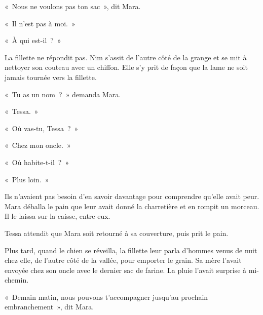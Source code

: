 \documentclass[10pt,a4paper]{article}
\begin{document}
«~Nous ne voulons pas ton sac~», dit Mara.

«~Il n’est pas à moi.~»

«~À qui est-il~?~»

La fillette ne répondit pas. Nim s’assit de l’autre côté de la grange et se mit à nettoyer son couteau avec un chiffon. Elle s’y prit de façon que la lame ne soit jamais tournée vers la fillette.

«~Tu as un nom~?~» demanda Mara.

«~Tessa.~»

«~Où vas-tu, Tessa~?~»

«~Chez mon oncle.~»

«~Où habite-t-il~?~»

«~Plus loin.~»

Ils n’avaient pas besoin d’en savoir davantage pour comprendre qu’elle avait peur. Mara déballa le pain que leur avait donné la charretière et en rompit un morceau. Il le laissa sur la caisse, entre eux.

Tessa attendit que Mara soit retourné à sa couverture, puis prit le pain.

Plus tard, quand le chien se réveilla, la fillette leur parla d’hommes venus de nuit chez elle, de l’autre côté de la vallée, pour emporter le grain. Sa mère l’avait envoyée chez son oncle avec le dernier sac de farine. La pluie l’avait surprise à mi-chemin.

«~Demain matin, nous pouvons t’accompagner jusqu’au prochain embranchement~», dit Mara.
\end{document}
